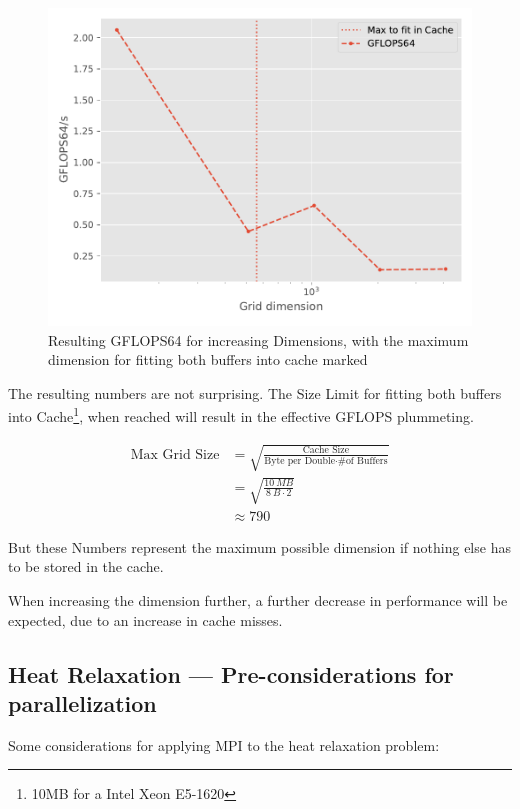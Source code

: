 \documentclass[]{scrartcl}
\begin{document}
\begin{figure}[H]
    \centering
    \includegraphics[]{img/heat.pdf}
    \caption{Resulting GFLOPS64 for increasing Dimensions, with the maximum dimension for fitting both buffers into cache marked}\label{fig:heat}
\end{figure}

The resulting numbers are not surprising.
The Size Limit for fitting both buffers into Cache\footnote{10MB for a Intel Xeon E5-1620}, when reached will result in the effective GFLOPS plummeting.


\begin{align}
    \text{Max Grid Size} &= \sqrt{\frac{\text{Cache Size}}{\text{Byte per Double} \cdot \text{\# of Buffers}}}\\
                                  &= \sqrt{\frac{\SI{10}{MB}}{\SI{8}{B}\cdot 2}}\\
                                  &\approx 790
\end{align}

But these Numbers represent the maximum possible dimension if nothing else has to be stored in the cache.

When increasing the dimension further, a further decrease in performance will be expected, due to an increase in cache misses.

\subsection{Heat Relaxation --- Pre-considerations for parallelization}
Some considerations for applying MPI to the heat relaxation problem:
\end{document}
